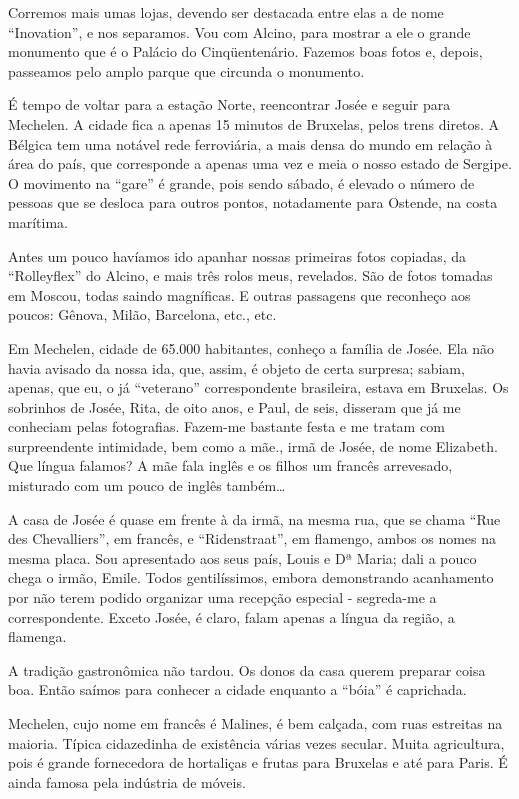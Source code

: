 Corremos mais umas lojas, devendo ser destacada entre elas a de nome “Inovation”, e nos separamos. Vou com Alcino, para mostrar a ele o grande monumento que é o Palácio do Cinqüentenário. Fazemos boas fotos e, depois, passeamos pelo amplo parque que circunda o monumento.

É tempo de voltar para a estação Norte, reencontrar Josée e seguir para Mechelen. A cidade fica a apenas 15 minutos de Bruxelas, pelos trens diretos. A Bélgica tem uma notável rede ferroviária, a mais densa do mundo em relação à área do país, que corresponde a apenas uma vez e meia o nosso estado de Sergipe. O movimento na “gare” é grande, pois sendo sábado, é elevado o número de pessoas que se desloca para outros pontos, notadamente para Ostende, na costa marítima.

Antes um pouco havíamos ido apanhar nossas primeiras fotos copiadas, da “Rolleyflex” do Alcino, e mais três rolos meus, revelados. São de fotos tomadas em Moscou, todas saindo magníficas. E outras passagens que reconheço aos poucos: Gênova, Milão, Barcelona, etc., etc.

Em Mechelen, cidade de 65.000 habitantes, conheço a família de Josée. Ela não havia avisado da nossa ida, que, assim, é objeto de certa surpresa; sabiam, apenas, que eu, o já “veterano” correspondente brasileira, estava em Bruxelas. Os sobrinhos de Josée, Rita, de oito anos, e Paul, de seis, disseram que já me conheciam pelas fotografias. Fazem-me bastante festa e me tratam com surpreendente intimidade, bem como a mãe., irmã de Josée, de nome Elizabeth. Que língua falamos? A mãe fala inglês e os filhos um francês arrevesado, misturado com um pouco de inglês também\ldots

A casa de Josée é quase em frente à da irmã, na mesma rua, que se chama “Rue des Chevalliers”, em francês, e “Ridenstraat”, em flamengo, ambos os nomes na mesma placa. Sou apresentado aos seus país, Louis e Dª Maria; dali a pouco chega o irmão, Emile. Todos gentilíssimos, embora demonstrando acanhamento por não terem podido organizar uma recepção especial - segreda-me a correspondente. Exceto Josée, é claro, falam apenas a língua da região, a flamenga.

A tradição gastronômica não tardou. Os donos da casa querem preparar coisa boa. Então saímos para conhecer a cidade enquanto a “bóia” é caprichada.

Mechelen, cujo nome em francês é Malines, é bem calçada, com ruas estreitas na maioria. Típica cidazedinha de existência várias vezes secular. Muita agricultura, pois é grande fornecedora de hortaliças e frutas para Bruxelas e até para Paris. É ainda famosa pela indústria de móveis.

